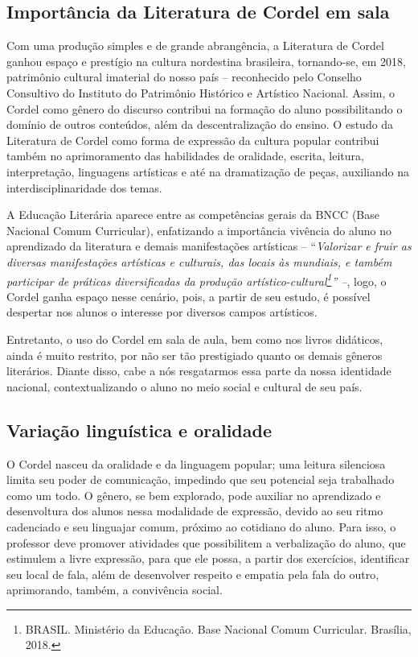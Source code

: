 \documentclass{extarticle}
\begin{document}
\subsection{Importância da Literatura de Cordel em sala}

Com uma produção simples e de grande abrangência, a Literatura de Cordel
ganhou espaço e prestígio na cultura nordestina brasileira, tornando-se,
em 2018, patrimônio cultural imaterial do nosso país -- reconhecido pelo
Conselho Consultivo do Instituto do Patrimônio Histórico e Artístico
Nacional. Assim, o Cordel como gênero do discurso contribui na formação
do aluno possibilitando o domínio de outros conteúdos, além da
descentralização do ensino. O estudo da Literatura de Cordel como forma
de expressão da cultura popular contribui também no aprimoramento das
habilidades de oralidade, escrita, leitura, interpretação, linguagens
artísticas e até na dramatização de peças, auxiliando na
interdisciplinaridade dos temas.

A Educação Literária aparece entre as competências gerais da BNCC (Base
Nacional Comum Curricular), enfatizando a importância vivência do aluno
no aprendizado da literatura e demais manifestações artísticas --
``\emph{Valorizar e fruir as diversas manifestações artísticas e
culturais, das locais às mundiais, e também participar de práticas
diversificadas da produção artístico-cultural\footnote{BRASIL. Ministério da Educação. Base Nacional Comum Curricular.
Brasília, 2018.}'' --},
logo, o Cordel ganha espaço nesse cenário, pois, a partir de seu estudo,
é possível despertar nos alunos o interesse por diversos campos
artísticos.

Entretanto, o uso do Cordel em sala de aula, bem como nos livros
didáticos, ainda é muito restrito, por não ser tão prestigiado quanto os
demais gêneros literários. Diante disso, cabe a nós resgatarmos essa
parte da nossa identidade nacional, contextualizando o aluno no meio
social e cultural de seu país.

\subsection{Variação linguística e oralidade}

O Cordel nasceu da oralidade e da linguagem popular; uma leitura
silenciosa limita seu poder de comunicação, impedindo que seu potencial
seja trabalhado como um todo. O gênero, se bem explorado, pode auxiliar
no aprendizado e desenvoltura dos alunos nessa modalidade de expressão,
devido ao seu ritmo cadenciado e seu linguajar comum, próximo ao
cotidiano do aluno. Para isso, o professor deve promover atividades que
possibilitem a verbalização do aluno, que estimulem a livre expressão,
para que ele possa, a partir dos exercícios, identificar seu local de
fala, além de desenvolver respeito e empatia pela fala do outro,
aprimorando, também, a convivência social.
\end{document}

